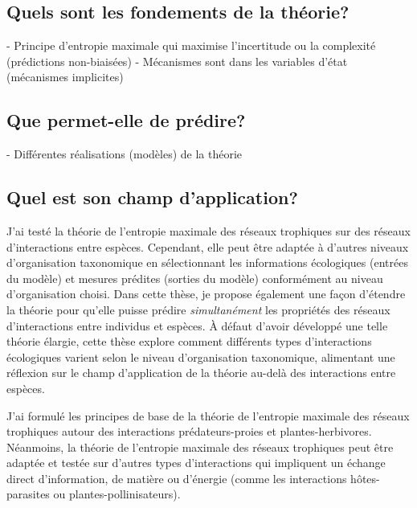 \subsection{Quels sont les fondements de la théorie?} 

- Principe d'entropie maximale qui maximise l'incertitude ou la complexité (prédictions non-biaisées) 
- Mécanismes sont dans les variables d'état (mécanismes implicites)

\subsection{Que permet-elle de prédire?} 

- Différentes réalisations (modèles) de la théorie 

\subsection{Quel est son champ d'application?} 

J'ai testé la théorie de l'entropie maximale des réseaux trophiques sur des
réseaux d'interactions entre espèces. Cependant, elle peut être adaptée à
d'autres niveaux d'organisation taxonomique en sélectionnant les informations
écologiques (entrées du modèle) et mesures prédites (sorties du modèle)
conformément au niveau d'organisation choisi. Dans cette thèse, je propose
également une façon d'étendre la théorie pour qu'elle puisse prédire
\textit{simultanément} les propriétés des réseaux d'interactions entre individus
et espèces. À défaut d'avoir développé une telle théorie élargie, cette thèse
explore comment différents types d'interactions écologiques varient selon le
niveau d'organisation taxonomique, alimentant une réflexion sur le champ
d'application de la théorie au-delà des interactions entre espèces. 

J'ai formulé les principes de base de la théorie de l'entropie maximale des
réseaux trophiques autour des interactions prédateurs-proies et
plantes-herbivores. Néanmoins, la théorie de l'entropie maximale des réseaux
trophiques peut être adaptée et testée sur d'autres types d'interactions qui
impliquent un échange direct d'information, de matière ou d'énergie (comme les
interactions hôtes-parasites ou plantes-pollinisateurs).

